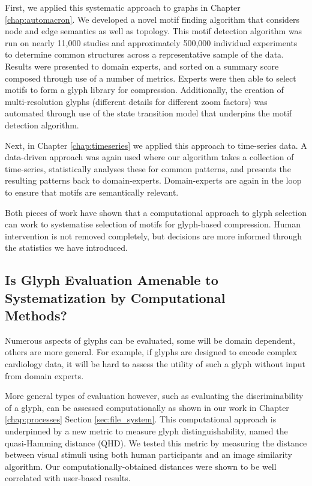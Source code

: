 First, we applied this systematic approach to graphs in Chapter \ref{chap:automacron}.
We developed a novel motif finding algorithm that considers node and edge semantics as well as topology.
This motif detection algorithm was run on nearly 11,000 studies and approximately 500,000 individual experiments to determine common structures across a representative sample of the data.
Results were presented to domain experts, and sorted on a summary score composed through use of a number of metrics.
Experts were then able to select motifs to form a glyph library for compression.
Additionally, the creation of multi-resolution glyphs (different details for different zoom factors) was automated through use of the state transition model that underpins the motif detection algorithm.

Next, in Chapter \ref{chap:timeseries} we applied this approach to time-series data.
A data-driven approach was again used where our algorithm takes a collection of time-series, statistically analyses these for common patterns, and presents the resulting patterns back to domain-experts.
Domain-experts are again in the loop to ensure that motifs are semantically relevant.

Both pieces of work have shown that a computational approach to glyph selection can work to systematise selection of motifs for glyph-based compression.
Human intervention is not removed completely, but decisions are more informed through the statistics we have introduced.

\subsection{Is Glyph Evaluation Amenable to Systematization by Computational \\Methods?}
Numerous aspects of glyphs can be evaluated, some will be domain dependent, others are more general.
For example, if glyphs are designed to encode complex cardiology data, it will be hard to assess the utility of such a glyph without input from domain experts.
 
More general types of evaluation however, such as evaluating the discriminability of a glyph, can be assessed computationally as shown in our work in Chapter \ref{chap:processes} Section \ref{sec:file_system}.
This computational approach is underpinned by a new metric to measure glyph distinguishability, named the quasi-Hamming distance (QHD).
We tested this metric by measuring the distance between visual stimuli using both human participants and an image similarity algorithm.
Our computationally-obtained distances were shown to be well correlated with user-based results.

